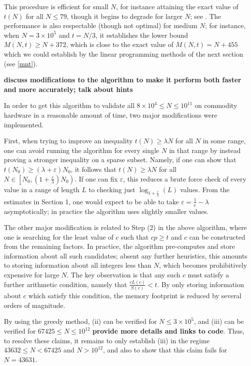\documentclass[12pt,a4paper,reqno]{amsart}
\numberwithin{equation}{section}
\theoremstyle{plain}
\theoremstyle{definition}
\newcommand\eps{\varepsilon}
\begin{document}
This procedure is efficient for small $N$, for instance attaining the exact value of $t(N)$ for all $N \leq 79$, though it begins to degrade for larger $N$; see .  The performance is also respectable (though not optimal) for medium $N$; for instance, when $N=3 \times 10^5$ and $t=N/3$, it establishes the lower bound $M(N,t) \geq N+372$, which is close to the exact value of $M(N,t) = N+455$ which we could establish by the linear programming methods of the next section (see \eqref{mnt}).

{\bf discuss modifications to the algorithm to make it perform both faster and more accurately; talk about hints}

In order to get this algorithm to validate all $8 \times 10^4 \leq N \leq 10^{11}$ on commodity hardware in a reasonable amount of time, two major modifications were implemented. 

First, when trying to improve an inequality $t(N) \geq \lambda N$ for all $N$ in some range, one can avoid running the algorithm for every single $N$ in that range by instead proving a stronger inequality on a sparse subset. Namely, if one can show that $t(N_0) \geq (\lambda + \eps)N_0$, it follows that $t(N) \geq \lambda N$ for all $N \in \left[N_0, (1+\frac{\eps}{\lambda})N_0\right)$. If one can fix $\eps$, this reduces a brute force check of every value in a range of length $L$ to checking just $\log_{1+\frac{\eps}{\lambda}}(L)$ values. From the estimates in Section 1, one would expect to be able to take $\eps = \frac{1}{e}-\lambda$ asymptotically; in practice the algorithm uses slightly smaller values. 

The other major modification is related to Step (2) in the above algorithm, where one is searching for the least value of $c$ such that $cp\geq t$ and $c$ can be constructed from the remaining factors. In practice, the algorithm pre-computes and store information about all such candidates; absent any further heuristics, this amounts to storing information about all integers less than $N$, which becomes prohibitively expensive for large $N$. The key observation is that any such $c$ must satisfy a further arithmetic condition, namely that $\frac{cL(c)}{S(c)} < t$. By only storing information about $c$ which satisfy this condition, the memory footprint is reduced by several orders of magnitude.

By using the greedy method, (ii) can be verified for $N \leq 3 \times 10^5$, and (iii) can be verified for $67425 \leq N \leq 10^{12}$ {\bf provide more details and links to code}.    Thus, to resolve these claims, it remains to only establish (iii) in the regime $43632 \leq N < 67425$ and $N > 10^{12}$, and also to show that this claim fails for $N=43631$.
\end{document}
